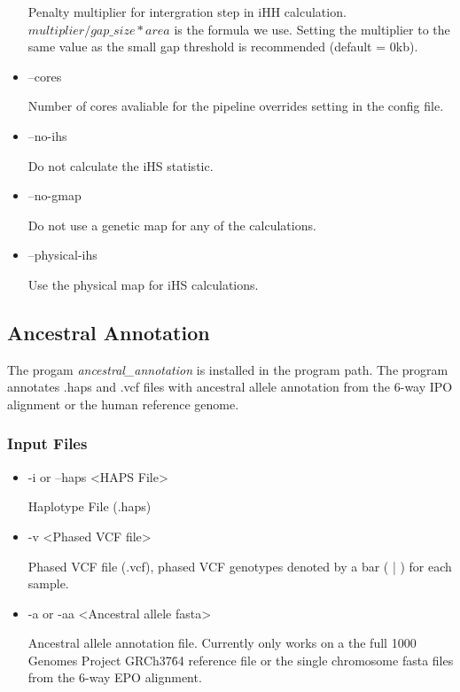 \documentclass[a4paper,10pt]{article}
\begin{document}
\begin{itemize}
                             Penalty multiplier for intergration step in iHH
                             calculation. $multiplier/gap\_size * area$ is the formula we
                             use. Setting the multiplier to the same value as the small gap
                             threshold is recommended (default = 0kb).

                             \item --cores 

                             Number of cores avaliable for the pipeline overrides setting in the config file. 

                             \item --no-ihs

                             Do not calculate the iHS statistic.

                             \item --no-gmap

                             Do not use a genetic map for any of the calculations.

                             \item --physical-ihs

                             Use the physical map for iHS calculations.

                             \end{itemize}
                             \subsection{Ancestral Annotation}
                             The progam \emph{ancestral\_annotation} is installed in the program
                             path. The program annotates .haps and .vcf files with ancestral allele
                             annotation from the 6-way IPO alignment or the human reference genome.
                             \subsubsection{Input Files}
                             \begin{itemize}
                             \item -i or --haps <HAPS File>

                             Haplotype File (.haps)

                             \item -v <Phased VCF file>

                             Phased VCF file (.vcf), phased VCF genotypes denoted by a bar ( | ) for each sample.
                             \item -a or -aa <Ancestral allele fasta>

                             Ancestral allele annotation file. Currently only works on a the full
                             1000 Genomes Project GRCh37\.64 reference file or the single chromosome fasta
                             files from the 6-way EPO alignment.

                             \end{itemize}
\end{document}
